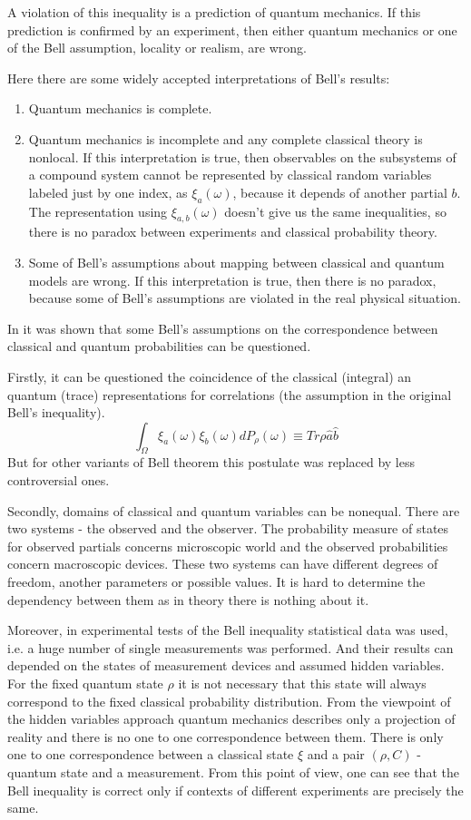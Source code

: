 \documentclass[%
master,         %
subf,           %
href,           %
colorlinks=true %
]{disser}
\numberwithin{equation}{section}
\numberwithin{figure}{section}
\begin{document}
A violation of this inequality is a prediction of quantum mechanics. If this prediction is confirmed by an experiment, then either quantum mechanics or one of the Bell assumption, locality or realism, are wrong.

Here there are some widely accepted interpretations of Bell's results:
\begin{enumerate}
\item Quantum mechanics is complete.

\item Quantum mechanics is incomplete and any complete classical theory is nonlocal.
If this interpretation is true, then observables on the subsystems of a compound system cannot be represented by classical random variables labeled just by one index, as $\xi_a(\omega)$, because  it depends of another partial $b$. The representation using $\xi_{a,b}(\omega)$ doesn't give us the same inequalities, so there is no paradox between experiments and classical probability theory.

\item Some of Bell's assumptions about mapping between classical and quantum models are wrong. If this interpretation is true, then there is no paradox, because some of Bell's assumptions are violated in the real physical situation.
\end{enumerate}

In \cite{Khrennikov_information} it was shown that some Bell's assumptions on the correspondence between classical and quantum probabilities can be questioned.

Firstly, it can be questioned the coincidence of the classical (integral) an quantum (trace) representations for correlations (the assumption in the original Bell's inequality).
$$\int_\Omega\xi_a(\omega)\xi_b(\omega)dP_\rho(\omega) \equiv Tr\rho\hat{a}\hat{b}$$
But for other variants of Bell theorem this postulate was replaced by less controversial ones.

Secondly, domains of classical and quantum variables can be nonequal. There are two systems - the observed and the observer. The probability measure of states for observed partials concerns microscopic world and the observed probabilities concern macroscopic devices. These two systems can have different degrees of freedom, another parameters or possible values. It is hard to determine the dependency between them as in theory there is nothing about it.

Moreover, in experimental tests of the Bell inequality statistical data was used, i.e. a huge number of single measurements was performed. And their results can depended on the states of measurement devices and assumed hidden variables. For the fixed quantum state $\rho$ it is not necessary that this state will always correspond to the fixed classical probability distribution. From the viewpoint of the hidden variables approach quantum mechanics describes only a projection of reality and there is no one to one correspondence between them. There is only one to one correspondence between a classical state $\xi$ and a pair $(\rho, C)$ - quantum state and a measurement. From this point of view, one can see that the Bell inequality is correct only if contexts of different experiments are precisely the same.
\end{document}
